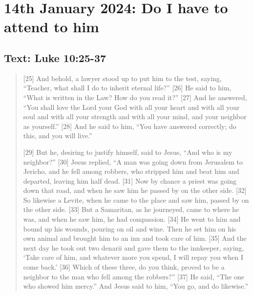 \setcounter{figure}{0}

\section{14th January 2024: Do I have to attend to him}
\subsection*{Text: Luke 10:25-37}
  \begin{quote}
    [25] And behold, a lawyer stood up to put him to the test, saying,
    “Teacher, what shall I do to inherit eternal life?” [26] He said to him,
    “What is written in the Law? How do you read it?” [27] And he answered,
    “You shall love the Lord your God with all your heart and with all your
    soul and with all your strength and with all your mind, and your neighbor
    as yourself.” [28] And he said to him, “You have answered correctly; do
    this, and you will live.”

    [29] But he, desiring to justify himself, said to Jesus, “And who is my
    neighbor?” [30] Jesus replied, “A man was going down from Jerusalem to
    Jericho, and he fell among robbers, who stripped him and beat him and
    departed, leaving him half dead. [31] Now by chance a priest was going
    down that road, and when he saw him he passed by on the other side. [32]
    So likewise a Levite, when he came to the place and saw him, passed by on
    the other side. [33] But a Samaritan, as he journeyed, came to where he
    was, and when he saw him, he had compassion. [34] He went to him and
    bound up his wounds, pouring on oil and wine. Then he set him on his own
    animal and brought him to an inn and took care of him. [35] And the next
    day he took out two denarii and gave them to the innkeeper, saying, ‘Take
    care of him, and whatever more you spend, I will repay you when I come
    back.’ [36] Which of these three, do you think, proved to be a neighbor
    to the man who fell among the robbers?” [37] He said, “The one who showed
    him mercy.” And Jesus said to him, “You go, and do likewise.”
  \end{quote}
